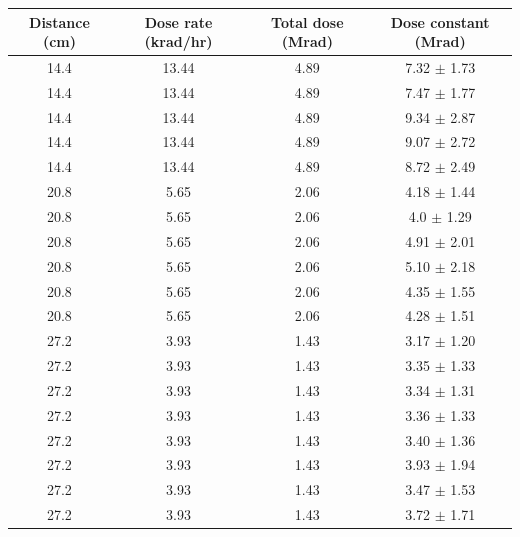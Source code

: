 \begin{table}[htbh]
\begin{center}
\begin{tabular}{|c|c|c|c|}
\hline
Distance (cm) & Dose rate (krad/hr) & Total dose (Mrad) & Dose constant (Mrad)\\
\hline
\hline
14.4 & 13.44 & 4.89 & 7.32 $\pm$ 1.73\\
14.4 & 13.44 & 4.89 & 7.47 $\pm$ 1.77\\
14.4 & 13.44 & 4.89 & 9.34 $\pm$ 2.87\\
14.4 & 13.44 & 4.89 & 9.07 $\pm$ 2.72\\
14.4 & 13.44 & 4.89 & 8.72 $\pm$ 2.49\\
20.8 & 5.65 & 2.06 & 4.18 $\pm$ 1.44\\
20.8 & 5.65 & 2.06 & 4.0 $\pm$ 1.29\\
20.8 & 5.65 & 2.06 & 4.91 $\pm$ 2.01\\
20.8 & 5.65 & 2.06 & 5.10 $\pm$ 2.18\\
20.8 & 5.65 & 2.06 & 4.35 $\pm$ 1.55\\
20.8 & 5.65 & 2.06 & 4.28 $\pm$ 1.51\\
27.2 & 3.93 & 1.43 & 3.17 $\pm$ 1.20\\
27.2 & 3.93 & 1.43 & 3.35 $\pm$ 1.33\\
27.2 & 3.93 & 1.43 & 3.34 $\pm$ 1.31\\
27.2 & 3.93 & 1.43 & 3.36 $\pm$ 1.33\\
27.2 & 3.93 & 1.43 & 3.40 $\pm$ 1.36\\
27.2 & 3.93 & 1.43 & 3.93 $\pm$ 1.94\\
27.2 & 3.93 & 1.43 & 3.47 $\pm$ 1.53\\
27.2 & 3.93 & 1.43 & 3.72 $\pm$ 1.71\\
\hline
\end{tabular}
\end{center}
\end{table}

